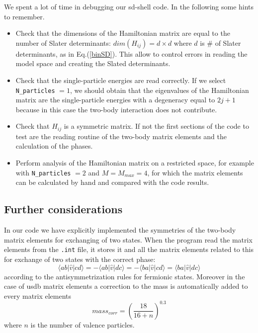 \documentclass[twoside]{article}
\newcommand{\bra}[1]{\langle #1 |}
\newcommand{\ket}[1]{| #1 \rangle}
\begin{document}
We spent a lot of time in debugging our sd-shell code. In the following some hints to remember.
\begin{itemize}
\item Check that the dimensions of the Hamiltonian matrix are equal to the number of Slater determinants: $dim(H_{ij})=d \times d$ where $d$ is $\#$ of Slater determinants, as in Eq.(\ref{binSD}). This allow to control errors in reading the model space and creating the Slated determinants.
\item Check that the single-particle energies are read correctly. If we select \texttt{N\_particles} $=1$, we should obtain that the eigenvalues of the Hamiltonian matrix are the single-particle energies with a degeneracy equal to $2j+1$ because in this case the two-body interaction does not contribute.
\item Check that $H_{ij}$ is a symmetric matrix. If not the first sections of the code to test are the reading routine of the two-body matrix elements and the calculation of the phases.
\item Perform analysis of the Hamiltonian matrix on a restricted space, for example with \texttt{N\_particles} $=2$ and $M=M_{max}=4$, for which the matrix elements can be calculated by hand and compared with the code results.
\end{itemize}

\subsection{Further considerations}

In our code we have explicitly implemented the symmetries of the two-body matrix elements for exchanging of two states. When the program read the matrix elements from the \texttt{.int} file, it stores it and all the matrix elements related to this for exchange of two states with the correct phase:
\begin{equation}
\bra{ab} \hat v \ket{cd} = -\bra{ab} \hat v \ket{dc}= -\bra{ba} \hat v \ket{cd}= \bra{ba} \hat v \ket{dc}
\end{equation}
according to the antisymmetrization rules for fermionic states. Moreover in the case of usdb matrix elements a correction to the mass is automatically added to every matrix elements
\begin{equation}
mass_{corr} = \left(\frac{18}{16+n} \right)^{0.3}
\end{equation}
where $n$ is the number of valence particles.
\\
\end{document}

